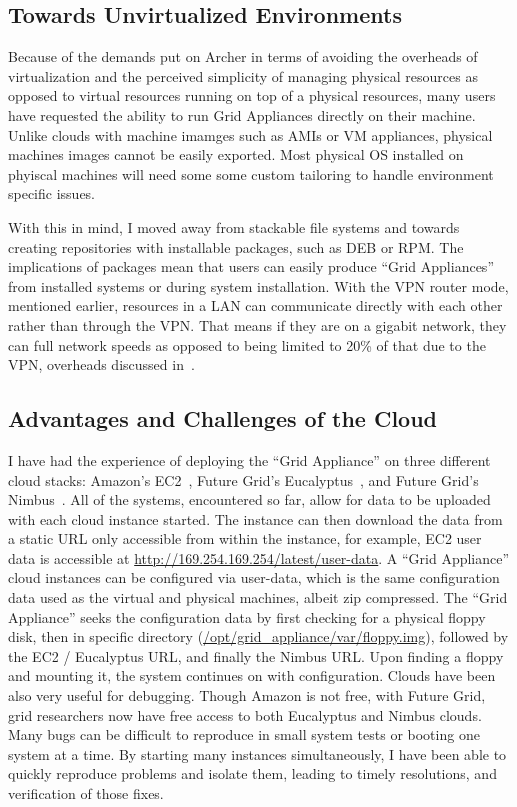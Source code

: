 \subsection{Towards Unvirtualized Environments}
\label{packaging}

Because of the demands put on Archer in terms of avoiding the overheads of
virtualization and the perceived simplicity of managing physical resources as
opposed to virtual resources running on top of a physical resources, many users
have requested the ability to run Grid Appliances directly on their machine.
Unlike clouds with machine imamges such as AMIs or VM appliances, physical
machines images cannot be easily exported.  Most physical OS installed on
phyiscal machines will need some some custom tailoring to handle environment
specific issues.

With this in mind, I moved away from stackable file systems and towards
creating repositories with installable packages, such as DEB or RPM.  The
implications of packages mean that users can easily produce ``Grid Appliances''
from installed systems or during system installation.  With the VPN router
mode, mentioned earlier, resources in a LAN can communicate directly with each
other rather than through the VPN.  That means if they are on a gigabit
network, they can full network speeds as opposed to being limited to 20\% of
that due to the VPN, overheads discussed in~\cite{sc09}.

\subsection{Advantages and Challenges of the Cloud}

I have had the experience of deploying the ``Grid Appliance'' on three
different cloud stacks:  Amazon's EC2~\cite{ec2}, Future Grid's
Eucalyptus~\cite{eucalyptus}, and Future Grid's Nimbus~\cite{nimbus}.  All of
the systems, encountered so far, allow for data to be uploaded with each cloud
instance started.  The instance can then download the data from a static URL
only accessible from within the instance, for example, EC2 user data is
accessible at \url{http://169.254.169.254/latest/user-data}. A ``Grid
Appliance'' cloud instances can be configured via user-data, which is the same
configuration data used as the virtual and physical machines, albeit zip
compressed.  The ``Grid Appliance'' seeks the configuration data by first
checking for a physical floppy disk, then in specific directory
(\url{/opt/grid\_appliance/var/floppy.img}), followed by the EC2 / Eucalyptus
URL, and finally the Nimbus URL.  Upon finding a floppy and mounting it, the
system continues on with configuration.  Clouds have been also very useful for
debugging.  Though Amazon is not free, with Future Grid, grid researchers now
have free access to both Eucalyptus and Nimbus clouds.  Many bugs can be
difficult to reproduce in small system tests or booting one system at a time.
By starting many instances simultaneously, I have been able to quickly
reproduce problems and isolate them, leading to timely resolutions, and
verification of those fixes.

